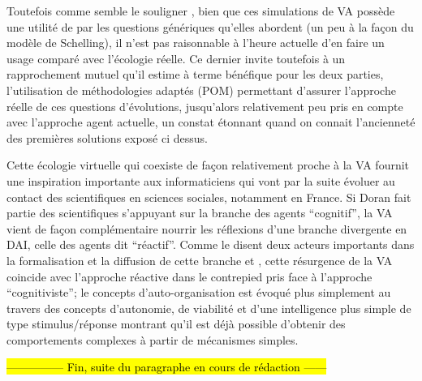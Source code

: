 
Toutefois comme semble le souligner \textcite{Dorin2008}, bien que ces simulations de VA possède une utilité de par les questions génériques qu'elles abordent (un peu à la façon du modèle de Schelling), il n'est pas raisonnable à l'heure actuelle d'en faire un usage comparé avec l'écologie réelle. Ce dernier invite toutefois à un rapprochement mutuel qu'il estime à terme bénéfique pour les deux parties, l'utilisation de méthodologies adaptés (POM) permettant d'assurer l'approche réelle de ces questions d'évolutions, jusqu'alors relativement peu pris en compte avec l'approche agent actuelle, un constat étonnant quand on connait l'ancienneté des premières solutions exposé ci dessus.

Cette écologie virtuelle qui coexiste de façon relativement proche à la VA fournit une inspiration importante aux informaticiens qui vont par la suite évoluer au contact des scientifiques en sciences sociales, notamment en France. Si Doran fait partie des scientifiques s'appuyant sur la branche des agents \enquote{cognitif}, la VA vient de façon complémentaire nourrir les réflexions d'une branche divergente en DAI, celle des agents dit \enquote{réactif}. Comme le disent deux acteurs importants dans la formalisation et la diffusion de cette branche \autocite[31-32]{Ferber1995} et \textcite[7-10]{Drogoul1993}, cette résurgence de la VA coincide avec l'approche réactive dans le contrepied pris face à l'approche \enquote{cognitiviste}; le concepts d'auto-organisation est évoqué plus simplement au travers des concepts d'autonomie, de viabilité et d'une intelligence plus simple de type stimulus/réponse montrant qu'il est déjà possible d'obtenir des comportements complexes à partir de mécanismes simples.



\hl{--------------- Fin, suite du paragraphe en cours de rédaction ------}



